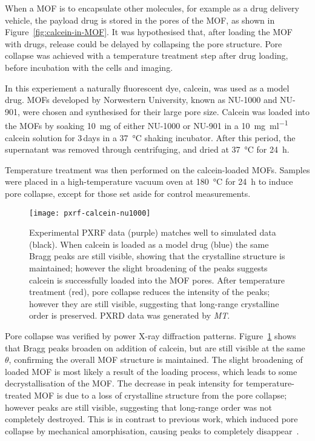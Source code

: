 When a MOF is to encapsulate other molecules, for example as a drug delivery vehicle, the payload drug is stored in the pores of the MOF, as shown in Figure~\ref{fig:calcein-in-MOF}. 
It was hypothesised that, after loading the MOF with drugs, release could be delayed by collapsing the pore structure. 
Pore collapse was achieved with a temperature treatment step after drug loading, before incubation with the cells and imaging. 

In this experiement a naturally fluorescent dye, calcein, was used as a model drug. 
MOFs developed by Norwestern University, known as NU-1000 and NU-901, were chosen and synthesised for their large pore size. 
Calcein was loaded into the MOFs by soaking \SI{10}{\milli\gram} of either NU-1000 or NU-901 in a \SI[per-mode=symbol]{10}{\milli\gram\per\milli\litre} calcein solution for 3\,days in a \SI{37}{\degreeCelsius} shaking incubator. 
After this period, the supernatant was removed through centrifuging, and dried at \SI{37}{\degreeCelsius} for \SI{24}{\hour}. 

Temperature treatment was then performed on the calcein-loaded MOFs. 
Samples were placed in a high-temperature vacuum oven at \SI{180}{\degreeCelsius} for \SI{24}{\hour} to induce pore collapse, except for those set aside for control measurements.  

\begin{figure}[htbp!]
\centering
\texttt{[image: pxrf-calcein-nu1000]}
\caption[MOFs: PXRF confirms calcein enters NU-1000 and temperature treatment causes partial pore collapse]{ Experimental PXRF data (purple) matches well to simulated data (black). When calcein is loaded as a model drug (blue) the same Bragg peaks are still visible, showing that the crystalline structure is maintained; however the slight broadening of the peaks suggests calcein is successfully loaded into the MOF pores. After temperature treatment (red), pore collapse reduces the intensity of the peaks; however they are still visible, suggesting that long-range crystalline order is preserved. PXRD data was generated by \textit{MT}. }
\label{fig:MOF-PXRF}
\end{figure}

Pore collapse was verified by power X-ray diffraction patterns. 
Figure~\ref{fig:MOF-PXRF} shows that Bragg peaks broaden on addition of calcein, but are still visible at the same $\theta$, confirming the overall MOF structure is maintained. 
The slight broadening of loaded MOF is most likely a result of the loading process, which leads to some decrystallisation of the MOF. 
The decrease in peak intensity for temperature-treated MOF is due to a loss of crystalline structure from the pore collapse; however peaks are still visible, suggesting that long-range order was not completely destroyed.
This is in contrast to previous work, which induced pore collapse by mechanical amorphisation, causing peaks to completely disappear~\cite{orellana2015amorphous}.

